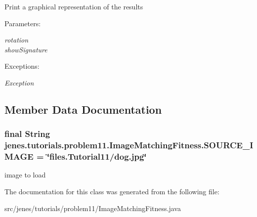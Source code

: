 Print a graphical representation of the results \begin{Desc}
\item[Parameters:]
\begin{description}
\item[{\em rotation}]\item[{\em showSignature}]\end{description}
\end{Desc}
\begin{Desc}
\item[Exceptions:]
\begin{description}
\item[{\em Exception}]\end{description}
\end{Desc}


\subsection{Member Data Documentation}
\hypertarget{classjenes_1_1tutorials_1_1problem11_1_1_image_matching_fitness_bcca6e100ede27ef9a90ddbc35497efd}{
\subsubsection[SOURCE\_\-IMAGE]{\setlength{\rightskip}{0pt plus 5cm}final String {\bf jenes.tutorials.problem11.ImageMatchingFitness.SOURCE\_\-IMAGE} = \char`\"{}files.Tutorial11/dog.jpg\char`\"{}}}
\label{classjenes_1_1tutorials_1_1problem11_1_1_image_matching_fitness_bcca6e100ede27ef9a90ddbc35497efd}


image to load 

The documentation for this class was generated from the following file:\begin{CompactItemize}
\item 
src/jenes/tutorials/problem11/ImageMatchingFitness.java\end{CompactItemize}
